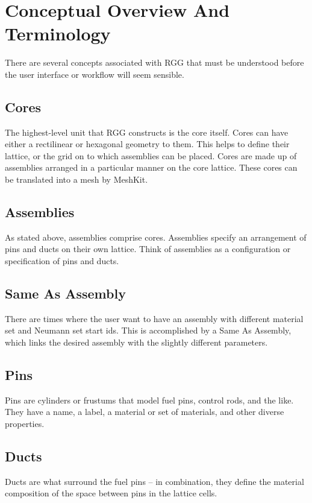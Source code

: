 \section{Conceptual Overview And Terminology}

There are several concepts associated with RGG that must be understood before the user interface or workflow will seem sensible.

\subsection{Cores}
The highest-level unit that RGG constructs is the core itself.  Cores can have either a rectilinear or hexagonal geometry to them.  This helps to define their lattice, or the grid on to which assemblies can be placed.  Cores are made up of assemblies arranged in a particular manner on the core lattice.  These cores can be translated into a mesh by MeshKit.

\subsection{Assemblies}
As stated above, assemblies comprise cores.  Assemblies specify an arrangement of pins and ducts on their own lattice.  Think of assemblies as a configuration or specification of pins and ducts.

\subsection{Same As Assembly}
There are times where the user want to have an assembly with different material set and Neumann set start ids.  This is accomplished by a Same As Assembly, which links the desired assembly with the slightly different parameters.

\subsection{Pins}
Pins are cylinders or frustums that model fuel pins, control rods, and the like.  They have a name, a label, a material or set of materials, and other diverse properties.

\subsection{Ducts}
Ducts are what surround the fuel pins -- in combination, they define the material composition of the space between pins in the lattice cells.

